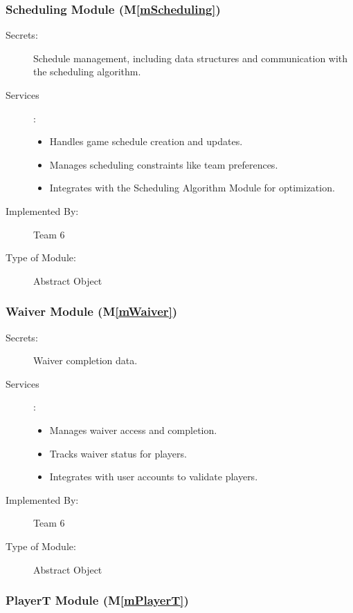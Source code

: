 \documentclass[12pt, titlepage]{article}
\newcommand{\mref}[1]{M\ref{#1}}
\begin{document}
\subsubsection{Scheduling Module (\mref{mScheduling})}

\begin{description}
  \item[Secrets:] Schedule management, including data structures and communication with the scheduling algorithm.

  \item[Services]:
        \begin{itemize}
          \item Handles game schedule creation and updates.
          \item Manages scheduling constraints like team preferences.
          \item Integrates with the Scheduling Algorithm Module for optimization.
        \end{itemize}
  \item[Implemented By:] Team 6
  \item[Type of Module:] Abstract Object
\end{description}

\subsubsection{Waiver Module (\mref{mWaiver})}

\begin{description}
  \item[Secrets:] Waiver completion data.
  \item[Services] :
        \begin{itemize}
          \item Manages waiver access and completion.
          \item Tracks waiver status for players.
          \item Integrates with user accounts to validate players.
        \end{itemize}
  \item[Implemented By:] Team 6
  \item[Type of Module:] Abstract Object
\end{description}

\subsubsection{PlayerT Module (\mref{mPlayerT})}
\end{document}
